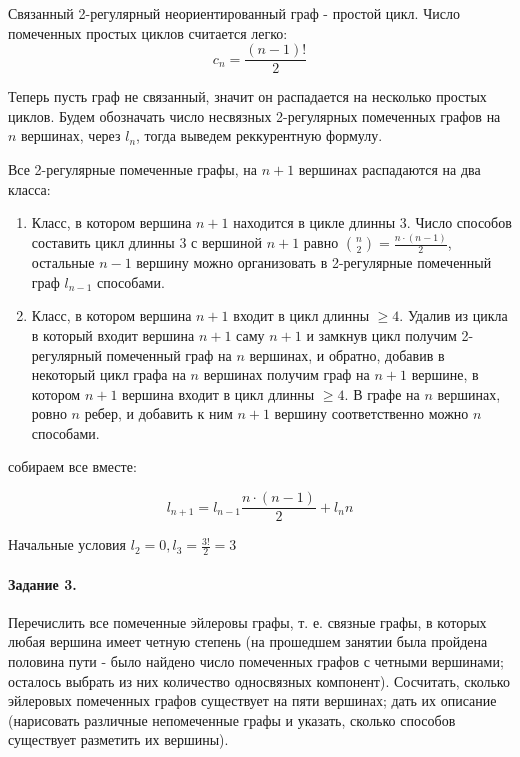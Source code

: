 \documentclass[a4paper,12pt]{article}
\begin{document}
\begin{Solution}
Связанный 2-регулярный неориентированный граф - простой цикл. Число помеченных простых циклов считается легко:
\[
	c_n = \frac{\left(n-1\right)!}{2}
\]

Теперь пусть граф не связанный, значит он распадается на несколько простых циклов. Будем обозначать число несвязных 2-регулярных помеченных графов на $n$ вершинах, через $l_n$, тогда выведем реккурентную формулу.

Все 2-регулярные помеченные графы, на $n+1$ вершинах распадаются на два класса:

\begin{enumerate}
\item Класс, в котором вершина $n+1$ находится в цикле длинны 3. Число способов составить цикл длинны 3 с вершиной $n+1$ равно $\binom{n}{2} = \frac{n\cdot\left(n-1\right)}{2}$, остальные $n-1$ вершину можно организовать в 2-регулярные помеченный граф $l_{n-1}$ способами.

\item Класс, в котором вершина $n+1$ входит в цикл длинны $\ge 4$. Удалив из цикла в который входит вершина $n+1$ саму $n+1$ и замкнув цикл получим 2-регулярный помеченный граф на $n$ вершинах, и обратно, добавив в некоторый цикл графа на $n$ вершинах получим граф на $n+1$ вершине, в котором $n+1$ вершина входит в цикл длинны $\ge 4$. В графе на $n$ вершинах, ровно $n$ ребер, и добавить к ним $n+1$ вершину соответственно можно $n$ способами.
\end{enumerate}

собираем все вместе:

\[
	l_{n+1} = l_{n-1} \frac{n\cdot\left(n-1\right)}{2} + l_n n
\]

Начальные условия $l_2 = 0, l_3 = \frac{3!}{2} = 3$

\end{Solution}

\paragraph{Задание 3.} Перечислить все помеченные эйлеровы графы, т. е. связные графы, в которых любая вершина имеет четную степень (на прошедшем занятии была пройдена половина пути - было найдено число помеченных графов с четными вершинами; осталось выбрать из них количество односвязных компонент). Сосчитать, сколько эйлеровых помеченных графов существует на пяти вершинах; дать их описание (нарисовать различные непомеченные графы и указать, сколько способов существует разметить их вершины).
\end{document}
